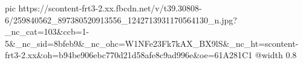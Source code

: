  
 
 
 
 

\ifcmt
  pic https://scontent-frt3-2.xx.fbcdn.net/v/t39.30808-6/259840562_897380520913556_1242713931170564130_n.jpg?_nc_cat=103&ccb=1-5&_nc_sid=8bfeb9&_nc_ohc=W1NFe23Fk7kAX_BX9lS&_nc_ht=scontent-frt3-2.xx&oh=b94be906ebc770d21d58afe8c9ad996e&oe=61A281C1
  @width 0.8
\fi
